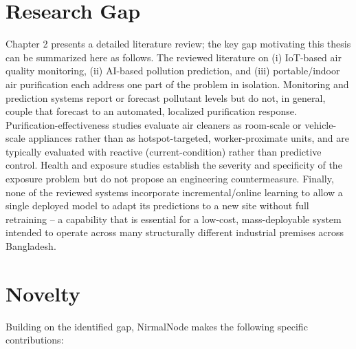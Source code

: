\section{Research Gap}
\label{sec:research-gap}

Chapter 2 presents a detailed literature review; the key gap motivating this thesis can be summarized here as follows. The reviewed literature on (i) IoT-based air quality monitoring, (ii) AI-based pollution prediction, and (iii) portable/indoor air purification each address one part of the problem in isolation. Monitoring and prediction systems \citep{alam2025iot,zhang2020realtime,kataria2022aiiot,mani2021aipowered,islam2025dhaka} report or forecast pollutant levels but do not, in general, couple that forecast to an automated, localized purification response. Purification-effectiveness studies \citep{dubey2021assessing,lu2023realworld,cox2018effectiveness,chen2022efficacy,lee2022effect,chen2025fine,szczotko2022review} evaluate air cleaners as room-scale or vehicle-scale appliances rather than as hotspot-targeted, worker-proximate units, and are typically evaluated with reactive (current-condition) rather than predictive control. Health and exposure studies \citep{nasri2023pm25,sekhavati2023particulate,alhadhrami2024pm25mental,rahman2025perceived} establish the severity and specificity of the exposure problem but do not propose an engineering countermeasure. Finally, none of the reviewed systems incorporate incremental/online learning to allow a single deployed model to adapt its predictions to a new site without full retraining -- a capability that is essential for a low-cost, mass-deployable system intended to operate across many structurally different industrial premises across Bangladesh.

\section{Novelty}
\label{sec:novelty}

Building on the identified gap, NirmalNode makes the following specific contributions:

